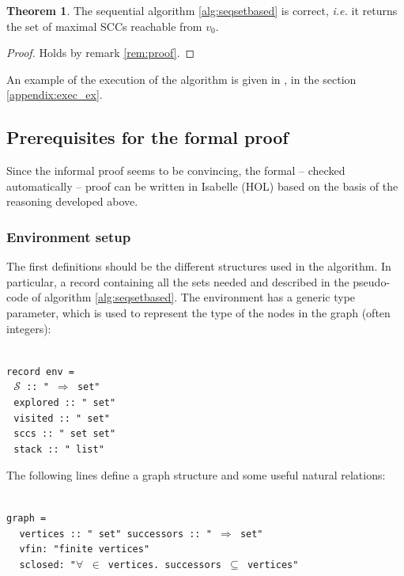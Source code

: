 \documentclass[a4 paper, 12pt]{article}
\renewcommand{\locale}{{\color{isa_blue}{locale}}}
\renewcommand{\and}{{\color{isa_green}{and}}}
\newcommand{\fixes}{{\color{isa_green}{fixes}}}
\newcommand{\assumes}{{\color{isa_green}{assumes}}}
\newcommand{\generic}[1]{{\color{isa_purple}{\textquotesingle#1}}}
\newcommand{\isa}[1]{\small\texttt{\\\noindent#1}}
\newcommand{\green}[1]{{\color{isa_dark_green}{#1}}}
\theoremstyle{definition}
\newtheorem{theorem}{Theorem}
\begin{document}
\begin{theorem}
    The sequential algorithm \ref{alg:seqsetbased} is correct, \textit{i.e.} it returns the set of maximal SCCs reachable from $v_0$.
\end{theorem}
\begin{proof}
    Holds by remark \ref{rem:proof}.
\end{proof}

An example of the execution of the algorithm is given in , in the section \ref{appendix:exec_ex}.


\subsection{Prerequisites for the formal proof}
Since the informal proof seems to be convincing, the formal -- checked automatically -- proof can be written in Isabelle (HOL) based on the basis of the reasoning developed above.

\subsubsection{Environment setup}\label{envdef}
The first definitions should be the different structures used in the algorithm. In particular, a record containing all the sets needed and described in the pseudo-code of algorithm \ref{alg:seqsetbased}. The environment has a generic type parameter, which is used to represent the type of the nodes in the graph (often integers):

\isa{
    {\color{isa_blue}record} \generic{v} env =\\
    $~~~\mathcal{S}$ :: "\generic{v} $\Rightarrow$ \generic{v} set"\\
    $~~~$explored :: "\generic{v} set"\\
    $~~~$visited :: "\generic{v} set"\\
    $~~~$sccs :: "\generic{v} set set"\\
    $~~~$stack :: "\generic{v} list"
}

\BlankLine
\BlankLine
\BlankLine

The following lines define a graph structure and some useful natural relations:

\isa{
    {\locale} graph =\\
    $~~~$\fixes{} vertices :: "\generic{v} set" \and{} successors :: "\generic{v} $\Rightarrow$ \generic{v} set"\\
    $~~~$\assumes{} vfin: "finite vertices"\\
    $~~~$\and{} sclosed: "$\forall$ \green{x} $\in$ vertices. successors \green{x} $\subseteq$ vertices"
}
\end{document}
